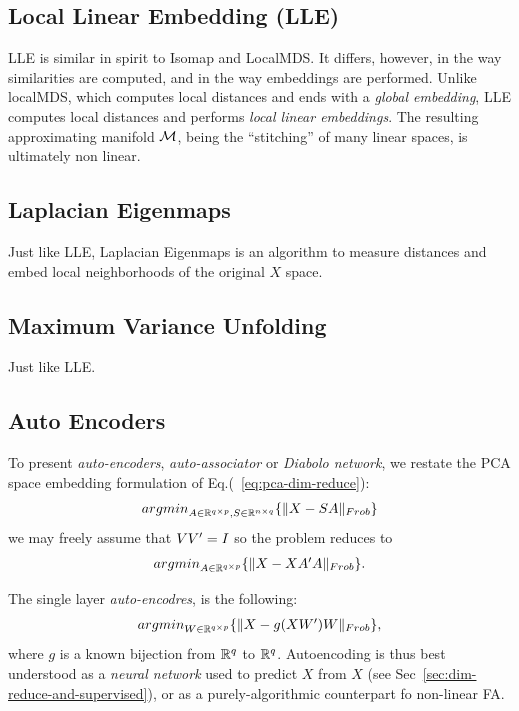 \documentclass[12pt,a4paper]{article}
\begin{document}
\subsection{Local Linear Embedding (LLE)}
\label{sec:lle}

LLE is similar in spirit to Isomap and LocalMDS.
It differs, however, in the way similarities are computed, and in the way embeddings are performed. 
Unlike localMDS, which computes local distances and ends with a \emph{global embedding}, LLE computes local distances and performs \emph{local linear embeddings}.
The resulting approximating manifold $\mathcal{M}$, being the ``stitching'' of many linear spaces, is ultimately non linear.



\subsection{Laplacian Eigenmaps}
Just like LLE, Laplacian Eigenmaps is an algorithm to measure distances and embed local neighborhoods of the original $X$ space.


\subsection{Maximum Variance Unfolding}
Just like LLE.





\subsection{Auto Encoders}
\label{sec:auto_encoders}

To present \emph{auto-encoders}, \aka \emph{auto-associator} or \emph{Diabolo network}, we restate the PCA space embedding formulation of Eq.(~\ref{eq:pca-dim-reduce}):
\begin{align}
	\textstyle{\mathop{argmin}_{A\in \mathbb{R}^{q \times p}, S\in \mathbb{R}^{n \times q}}}\{ \Vert X- SA \Vert_{Frob} \}
\end{align}
we may freely assume that $V V'=I$ so the problem reduces to
\begin{align}
	\textstyle{\mathop{argmin}_{A\in \mathbb{R}^{q \times p}}}\{ \Vert X- XA'A \Vert_{Frob} \}.
\end{align}


The single layer \emph{auto-encodres}, is the following:
\begin{align}
	\textstyle{\mathop{argmin}_{W\in \mathbb{R}^{q\times p}}}\{ \Vert X- g(XW')W \Vert_{Frob} \},
\end{align}
where $g$ is a known bijection from $\mathbb{R}^q$ to $\mathbb{R}^q$.
Autoencoding is thus best understood as a \emph{neural network} used to predict $X$ from $X$ (see Sec~\ref{sec:dim-reduce-and-supervised}), or as a purely-algorithmic counterpart fo non-linear FA.
\end{document}
